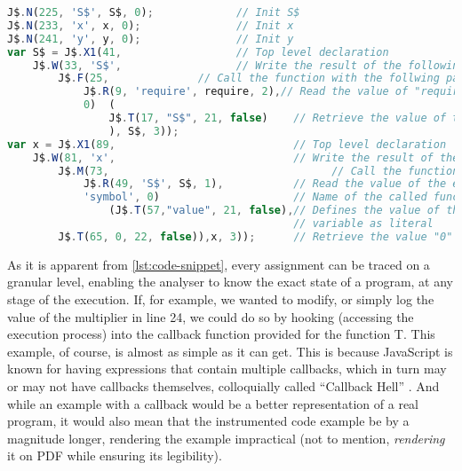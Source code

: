  \lstset{basicstyle=\footnotesize}
\begin{lstlisting}[language=JavaScript, float, floatplacement=tbp, caption={[Instrumented program snippet]Lines 1 and 4 of the program snippet \autoref{lst:expose-sample-program}, instrumented by \texttt{JALANGI2}, with explanation}, label={lst:code-snippet}]
J$.N(225, 'S$', S$, 0);             // Init S$
J$.N(233, 'x', x, 0);               // Init x
J$.N(241, 'y', y, 0);               // Init y
var S$ = J$.X1(41,                  // Top level declaration
    J$.W(33, 'S$',                  // Write the result of the following:
        J$.F(25,              // Call the function with the follwing parameter:
            J$.R(9, 'require', require, 2),// Read the value of "require"
            0)  (
                J$.T(17, "S$", 21, false)    // Retrieve the value of the S$ literal
                ), S$, 3));
var x = J$.X1(89,                            // Top level declaration
    J$.W(81, 'x',                            // Write the result of the following:
        J$.M(73,                                   // Call the function of:
            J$.R(49, 'S$', S$, 1),           // Read the value of the expression S$
            'symbol', 0)                     // Name of the called function
                (J$.T(57,"value", 21, false),// Defines the value of the 
                                             // variable as literal
        J$.T(65, 0, 22, false)),x, 3));      // Retrieve the value "0"


\end{lstlisting}

\newpage
As it is apparent from \autoref{lst:code-snippet}, every assignment can be traced on a granular level, enabling the analyser to know the exact state of a program, at any stage of the execution. If, for example, we wanted to modify, or simply log the value of the multiplier in line 24, we could do so by hooking (accessing the execution process) into the callback function provided for the function T.
This example, of course, is almost as simple as it can get. This is because JavaScript is known for having expressions that contain multiple callbacks, which in turn may or may not have callbacks themselves, colloquially called “Callback Hell” \cite{max_ogden_callback_2019}. And while an example with a callback would be a better representation of a real program, it would also mean that the instrumented code example be by a magnitude longer, rendering the example impractical (not to mention, \textit{rendering} it on PDF while ensuring its legibility). \\


